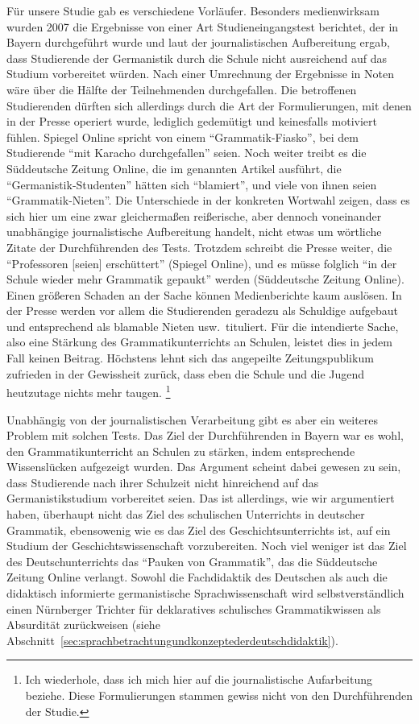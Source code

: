 Für unsere Studie gab es verschiedene Vorläufer.
Besonders medienwirksam wurden 2007 die Ergebnisse von einer Art Studieneingangstest berichtet, der in Bayern durchgeführt wurde und laut der journalistischen Aufbereitung \citep{Spiegelonline2007,Szonline2007} ergab, dass Studierende der Germanistik durch die Schule nicht ausreichend auf das Studium vorbereitet würden.
Nach einer Umrechnung der Ergebnisse in Noten wäre über die Hälfte der Teilnehmenden durchgefallen.
Die betroffenen Studierenden dürften sich allerdings durch die Art der Formulierungen, mit denen in der Presse operiert wurde, lediglich gedemütigt und keinesfalls motiviert fühlen.
Spiegel Online spricht von einem "`Grammatik-Fiasko"', bei dem Studierende "`mit Karacho durchgefallen"' seien.
Noch weiter treibt es die Süddeutsche Zeitung Online, die im genannten Artikel ausführt, die "`Germanistik-Studenten"' hätten sich "`blamiert"', und viele von ihnen seien "`Grammatik-Nieten"'.
Die Unterschiede in der konkreten Wortwahl zeigen, dass es sich hier um eine zwar gleichermaßen reißerische, aber dennoch voneinander unabhängige journalistische Aufbereitung handelt, nicht etwas um wörtliche Zitate der Durchführenden des Tests.
Trotzdem schreibt die Presse weiter, die "`Professoren [seien] erschüttert"' (Spiegel Online), und es müsse folglich "`in der Schule wieder mehr Grammatik gepaukt"' werden (Süddeutsche Zeitung Online). 
Einen größeren Schaden an der Sache können Medienberichte kaum auslösen.
In der Presse werden vor allem die Studierenden geradezu als Schuldige aufgebaut und entsprechend als blamable Nieten usw.\ tituliert.
Für die intendierte Sache, also eine Stärkung des Grammatikunterrichts an Schulen, leistet dies in jedem Fall keinen Beitrag.
Höchstens lehnt sich das angepeilte Zeitungspublikum zufrieden in der Gewissheit zurück, dass eben die Schule und die Jugend heutzutage nichts mehr taugen.%
\footnote{Ich wiederhole, dass ich mich hier auf die journalistische Aufarbeitung beziehe.
Diese Formulierungen stammen gewiss nicht von den Durchführenden der Studie.}

Unabhängig von der journalistischen Verarbeitung gibt es aber ein weiteres Problem mit solchen Tests.
Das Ziel der Durchführenden in Bayern war es wohl, den Grammatikunterricht an Schulen zu stärken, indem entsprechende Wissenslücken aufgezeigt wurden.
Das Argument scheint dabei gewesen zu sein, dass Studierende nach ihrer Schulzeit nicht hinreichend auf das Germanistikstudium vorbereitet seien.
Das ist allerdings, wie wir argumentiert haben, überhaupt nicht das Ziel des schulischen Unterrichts in deutscher Grammatik, ebensowenig wie es das Ziel des Geschichtsunterrichts ist, auf ein Studium der Geschichtswissenschaft vorzubereiten.
Noch viel weniger ist das Ziel des Deutschunterrichts das "`Pauken von Grammatik"', das die Süddeutsche Zeitung Online verlangt.
Sowohl die Fachdidaktik des Deutschen als auch die didaktisch informierte germanistische Sprachwissenschaft wird selbstverständlich einen Nürnberger Trichter für deklaratives schulisches Grammatikwissen als Absurdität zurückweisen (siehe Abschnitt~\ref{sec:sprachbetrachtungundkonzeptederdeutschdidaktik}).

